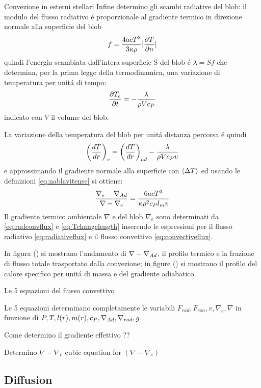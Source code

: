 \begin{wordonframe}{Convezione in esterni stellari}
Infine determino gli scambi radiative del blob: il modulo del flusso radiativo \'e proporzionale al gradiente termico in direzione normale alla superficie del blob
\begin{equation*}
f=\frac{4acT^3}{3\kappa\rho}|\PDy{n}{T}|
\end{equation*}
quindi l'energia scambiata dall'intera superficie S del blob \'e $\lambda=Sf$ che determina, per la prima legge della termodinamica, una variazione di temperatura per unit\'a di tempo:
\begin{equation*}
\PDy{t}{T_e}=-\frac{\lambda}{\rho Vc_P}
\end{equation*}
indicato con $V$ il volume del blob.

La variazione della temperatura del blob per unit\'a distanza percorsa \'e quindi
\begin{equation*}
\Dcvar{\TDy{r}{T}}{e}=\Dcvar{\TDy{r}{T}}{ad}-\frac{\lambda}{\rho Vc_Pv}\label{eq:Tchangelength}
\end{equation*}
e approssimando il gradiente normale alla superficie con $\exv{\Delta T}$ ed usando le definizioni \eqref{eq:nablavitense} si ottiene:
\begin{equation*}
\frac{\nabla_e-\nad{}}{\nabla-\nabla_e}=\frac{6acT^3}{\kappa\rho^2c_Pl_mv}
\end{equation*}
Il gradiente termico ambientale $\nabla$ e del blob $\nabla_e$ sono determinati da \eqref{eq:radconvflux} e \eqref{eq:Tchangelength} inserendo le espressioni per il flusso radiativo \eqref{eq:radiativeflux} e il flusso convettivo \eqref{eq:convectiveflux}.

In figura () si mostrano l'andamento di $\nabla-\nad{}$, il profilo termico e la frazione di flusso totale trasportato dalla convezione; in figure () si mostrano il profilo del calore specifico per unit\'a di massa e del gradiente adiabatico.

Le 5 equazioni del flusso convettivo

Le 5 equazioni determinano completamente le variabili $F_{rad}, F_{con}, v, \nabla_e, \nabla$ in funzione di $P,T,l(r),m(r),c_P,\nad{},\nrad{},g$.

Come determino il gradiente effettivo ??

Determino $\nabla-\nabla_e$
cubic equation for $(\nabla-\nabla_e)$

\end{wordonframe}

\subsection{Diffusion}

